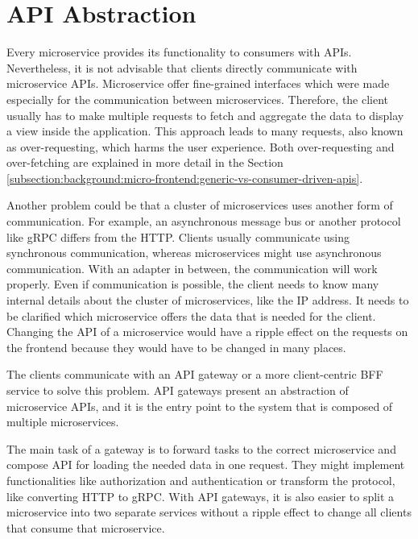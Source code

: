 \section{API Abstraction}\label{section:background:api-abstraction}

Every microservice provides its functionality to consumers with \acp{API}. Nevertheless, it is not advisable that clients directly communicate with microservice \acp{API}. Microservice offer fine-grained interfaces which were made especially for the communication between microservices. Therefore, the client usually has to make multiple requests to fetch and aggregate the data to display a view inside the application. \cite[69]{book:2021:newman:background:bff:micro-services} This approach leads to many requests, also known as over-requesting, which harms the user experience. \cite[254, 257]{book:2018:richardson:background:bff:microservices-patterns} Both over-requesting and over-fetching are explained in more detail in the Section \ref{subsection:background:micro-frontend:generic-vs-consumer-driven-apis}.

\bigskip

\noindent Another problem could be that a cluster of microservices uses another form of communication. For example, an asynchronous message bus or another protocol like \ac{gRPC} differs from the \ac{HTTP}. Clients usually communicate using synchronous communication, whereas microservices might use asynchronous communication. With an adapter in between, the communication will work properly. Even if communication is possible, the client needs to know many internal details about the cluster of microservices, like the \ac{IP} address. It needs to be clarified which microservice offers the data that is needed for the client. Changing the \ac{API} of a microservice would have a ripple effect on the requests on the frontend because they would have to be changed in many places. \cite[254-257]{book:2018:richardson:background:bff:microservices-patterns}

\bigskip

\noindent The clients communicate with an \ac{API} gateway or a more client-centric \ac{BFF} service to solve this problem. \ac{API} gateways present an abstraction of microservice \acp{API}, and it is the entry point to the system that is composed of multiple microservices. \cite[19-20]{book:2020:siriwardena:background:bff:microservice-security-in-action}

\bigskip

\noindent The main task of a gateway is to forward tasks to the correct microservice and compose \ac{API} for loading the needed data in one request. They might implement functionalities like authorization and authentication or transform the protocol, like converting \ac{HTTP} to \ac{gRPC}. With \ac{API} gateways, it is also easier to split a microservice into two separate services without a ripple effect to change all clients that consume that microservice. \cite[260-263]{book:2018:richardson:background:bff:microservices-patterns}

